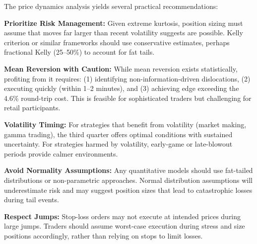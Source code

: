 The price dynamics analysis yields several practical recommendations:

\textbf{Prioritize Risk Management:} Given extreme kurtosis, position sizing must assume that moves far larger than recent volatility suggests are possible. Kelly criterion or similar frameworks should use conservative estimates, perhaps fractional Kelly (25--50\%) to account for fat tails.

\textbf{Mean Reversion with Caution:} While mean reversion exists statistically, profiting from it requires: (1) identifying non-information-driven dislocations, (2) executing quickly (within 1--2 minutes), and (3) achieving edge exceeding the 4.6\% round-trip cost. This is feasible for sophisticated traders but challenging for retail participants.

\textbf{Volatility Timing:} For strategies that benefit from volatility (market making, gamma trading), the third quarter offers optimal conditions with sustained uncertainty. For strategies harmed by volatility, early-game or late-blowout periods provide calmer environments.

\textbf{Avoid Normality Assumptions:} Any quantitative models should use fat-tailed distributions or non-parametric approaches. Normal distribution assumptions will underestimate risk and may suggest position sizes that lead to catastrophic losses during tail events.

\textbf{Respect Jumps:} Stop-loss orders may not execute at intended prices during large jumps. Traders should assume worst-case execution during stress and size positions accordingly, rather than relying on stops to limit losses.
